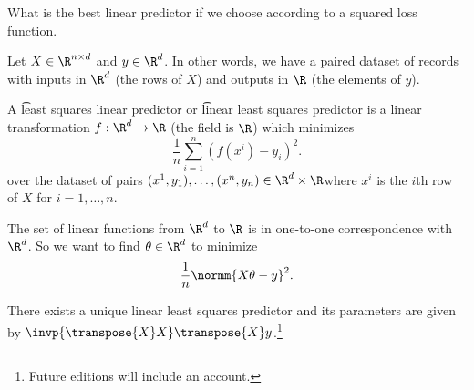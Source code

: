 

What is the best linear predictor if we choose according to a squared loss function.


Let $X \in \R^{n \times d}$ and $y \in \R^d$.
In other words, we have a paired dataset of records with inputs in $\R^d$ (the rows of $X$) and outputs in $\R$ (the elements of $y$).

A \t{least squares linear predictor} or \t{linear least squares predictor} is a linear transformation $f: \R^d \to \R$ (the field is $\R$) which minimizes
\[
  \frac{1}{n} \sum_{i = 1}^{n} (f(x^i) - y_i)^2.
\]
over the dataset of pairs $(x^1, y_1), \dots, (x^n, y_n) \in \R^d \times \R$where $x^i$ is the $i$th row of $X$ for $i = 1, \dots, n$.

The set of linear functions from $\R^d$ to $\R$ is in one-to-one correspondence with $\R^d$.
So we want to find $\theta \in \R^d$ to  minimize
\[
  \frac{1}{n} \normm{X\theta - y}^2.
\]


\begin{proposition}
  There exists a unique linear least squares predictor and its parameters are given by $\invp{\transpose{X}X}\transpose{X}y$.\footnote{Future editions will include an account.}
\end{proposition}


\blankpage
